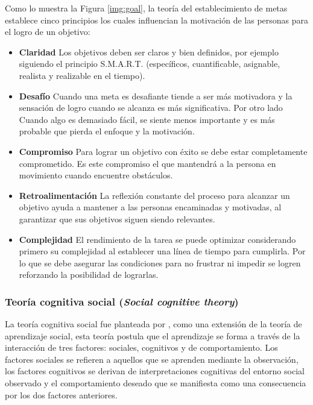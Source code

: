 Como lo muestra la Figura \ref{img:goal}, la teoría del establecimiento de metas establece cinco principios 
los cuales influencian la motivación de las personas para el logro de un objetivo:

\begin{itemize}
\item \textbf{Claridad} Los objetivos deben ser claros y bien definidos, por ejemplo siguiendo el principio 
S.M.A.R.T. (específicos, cuantificable, asignable, realista y realizable en el tiempo).
\item \textbf{Desafío} Cuando una meta es desafiante tiende a ser más motivadora y la sensación de logro 
cuando se alcanza es más significativa. Por otro lado Cuando algo es demasiado fácil, se siente menos 
importante y es más probable que pierda el enfoque y la motivación.
\item \textbf{Compromiso} Para lograr un objetivo con éxito se debe estar completamente comprometido. Es este
compromiso el que mantendrá a la persona en movimiento cuando encuentre obstáculos.
\item \textbf{Retroalimentación} La reflexión constante del proceso para alcanzar un objetivo ayuda a 
mantener a las personas encaminadas y motivadas, al garantizar que sus objetivos siguen siendo relevantes.
\item \textbf{Complejidad} El rendimiento de la tarea se puede optimizar considerando primero su complejidad
al establecer una línea de tiempo para cumplirla. Por lo que se debe asegurar las condiciones para no frustrar
ni impedir se logren reforzando la posibilidad de lograrlas.
\end{itemize}

\subsubsection{Teoría cognitiva social (\textit{Social cognitive theory})}

La teoría cognitiva social fue planteada por , como una extensión de la teoría de 
aprendizaje social, esta teoría postula que el aprendizaje se forma a través de la interacción de tres
factores: sociales, cognitivos y de comportamiento. Los factores sociales se refieren a aquellos que se 
aprenden mediante la observación, los factores cognitivos se derivan de interpretaciones cognitivas del 
entorno social observado y el comportamiento deseado que se manifiesta como una consecuencia por los dos 
factores anteriores.

